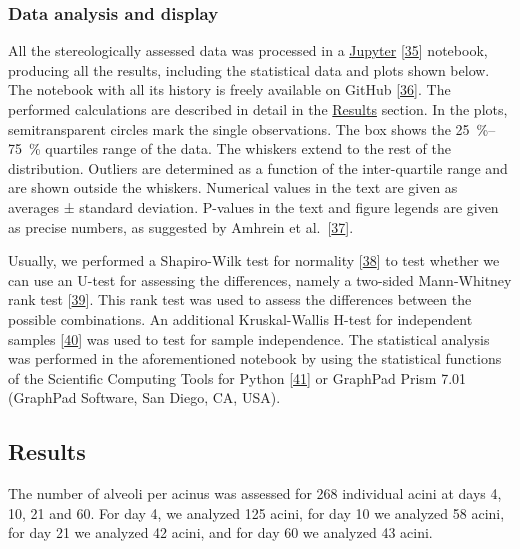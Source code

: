 \documentclass[
  american,
]{article}
\begin{document}
\hypertarget{data-analysis-and-display}{%
\subsubsection{Data analysis and display}\label{data-analysis-and-display}}

All the stereologically assessed data was processed in a \href{http://jupyter.org/}{Jupyter} {[}\protect\hyperlink{ref-pQ6Wbz73}{35}{]} notebook, producing all the results, including the statistical data and plots shown below.
The notebook with all its history is freely available on GitHub {[}\protect\hyperlink{ref-V87xbt0b}{36}{]}.
The performed calculations are described in detail in the \protect\hyperlink{results}{Results} section.
In the plots, semitransparent circles mark the single observations.
The box shows the 25~\%--75~\% quartiles range of the data.
The whiskers extend to the rest of the distribution.
Outliers are determined as a function of the inter-quartile range and are shown outside the whiskers.
Numerical values in the text are given as averages ± standard deviation.
P-values in the text and figure legends are given as precise numbers, as suggested by Amhrein et al.~{[}\protect\hyperlink{ref-o21zxPIu}{37}{]}.

Usually, we performed a Shapiro-Wilk test for normality {[}\protect\hyperlink{ref-IkHrgIj3}{38}{]} to test whether we can use an U-test for assessing the differences, namely a two-sided Mann-Whitney rank test {[}\protect\hyperlink{ref-MyzxBJ57}{39}{]}.
This rank test was used to assess the differences between the possible combinations.
An additional Kruskal-Wallis H-test for independent samples {[}\protect\hyperlink{ref-ON1Bppkk}{40}{]} was used to test for sample independence.
The statistical analysis was performed in the aforementioned notebook by using the statistical functions of the Scientific Computing Tools for Python {[}\protect\hyperlink{ref-8Miti2Gz}{41}{]} or GraphPad Prism 7.01 (GraphPad Software, San Diego, CA, USA).

\hypertarget{results}{%
\subsection{Results}\label{results}}

The number of alveoli per acinus was assessed for 268 individual acini at days 4, 10, 21 and 60.
For day 4, we analyzed 125 acini, for day 10 we analyzed 58 acini, for day 21 we analyzed 42 acini, and for day 60 we analyzed 43 acini.
\end{document}
